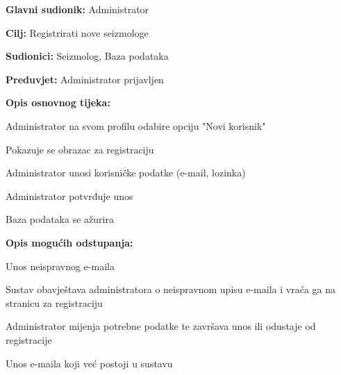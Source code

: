 					\noindent {}
					\begin{packed_item}
	
						\item \textbf{Glavni sudionik:} Administrator
						\item \textbf{Cilj:} Registrirati nove seizmologe
						\item \textbf{Sudionici:} Seizmolog, Baza podataka
						\item \textbf{Preduvjet:} Administrator prijavljen
						\item \textbf{Opis osnovnog tijeka:}
						
						\item[] \begin{packed_enum}
	
							\item Administrator na svom profilu odabire opciju "Novi korisnik"
							\item Pokazuje se obrazac za registraciju
							\item Administrator unosi korisničke podatke (e-mail, lozinka)
							\item Administrator potvrđuje unos
							\item Baza podataka se ažurira
						
						\end{packed_enum}
						
						\item  \textbf{Opis mogućih odstupanja:}
						
						\item[] \begin{packed_item}
	
							\item[3.a] Unos neispravnog e-maila
							\item[] \begin{packed_enum}
								
								\item Sustav obavještava administratora o neispravnom upisu e-maila i vraća ga na stranicu za registraciju
								\item Administrator mijenja potrebne podatke te završava unos ili odustaje od registracije
								\end{packed_enum}
							\item[3.b] Unos e-maila koji već postoji u sustavu
								\item[] \begin{packed_enum}
									

\end{packed_enum}
\end{packed_item}
\end{packed_item}
